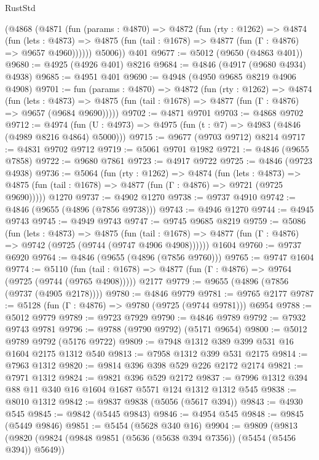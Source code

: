 \begin{lexlean}{RustStd}
\begin{coremodule}
      (@4868
        (@4871
          (fun (params : @4870) =>
          @4872
            (fun (rty : @1262) =>
            @4874
              (fun (lets : @4873) =>
              @4875 (fun (tail : @1678) => @4877 (fun (Γ : @4876) => @9657 @4960))))))
        @5006))
    @401
@9677 := @5012 (@9650 (@4863 @401))
@9680 := @4925 (@4926 @401) @8216
@9684 := @4846 (@4917 (@9680 @4934) @4938)
@9685 := @4951 @401
@9690 := @4948 (@4950 @9685 @8219 @4906 @4908)
@9701 := fun (params : @4870) =>
  @4872
    (fun (rty : @1262) =>
    @4874
      (fun (lets : @4873) =>
      @4875 (fun (tail : @1678) => @4877 (fun (Γ : @4876) => @9657 (@9684 @9690)))))
@9702 := @4871 @9701
@9703 := @4868 @9702
@9712 := @4974 (fun (U : @4973) => @4975 (fun (t : @7) => @4983 (@4846 (@4989 @8216 @4864) @5000)))
@9715 := @9677 (@9703 @9712) @8214
@9717 := @4831 @9702 @9712
@9719 := @5061 @9701 @1982
@9721 := @4846 (@9655 @7858)
@9722 := @9680 @7861
@9723 := @4917 @9722
@9725 := @4846 (@9723 @4938)
@9736 := @5064
    (fun (rty : @1262) =>
    @4874
      (fun (lets : @4873) =>
      @4875 (fun (tail : @1678) => @4877 (fun (Γ : @4876) => @9721 (@9725 @9690)))))
    @1270
@9737 := @4902 @1270
@9738 := @9737 @4910
@9742 := @4846 (@9655 (@4896 (@7856 @9738)))
@9743 := @4946 @1270
@9744 := @4945 @9743
@9745 := @4949 @9743
@9747 := @9745 @9685 @8219
@9759 := @5086
    (fun (lets : @4873) =>
    @4875
      (fun (tail : @1678) => @4877 (fun (Γ : @4876) => @9742 (@9725 (@9744 (@9747 @4906 @4908))))))
    @1604
@9760 := @9737 @6920
@9764 := @4846 (@9655 (@4896 (@7856 @9760)))
@9765 := @9747 @1604
@9774 := @5110
    (fun (tail : @1678) => @4877 (fun (Γ : @4876) => @9764 (@9725 (@9744 (@9765 @4908)))))
    @2177
@9779 := @9655 (@4896 (@7856 (@9737 (@4905 @2178))))
@9780 := @4846 @9779
@9781 := @9765 @2177
@9787 := @5128 (fun (Γ : @4876) => @9780 (@9725 (@9744 @9781))) @6954
@9788 := @5012 @9779
@9789 := @9723 @7929
@9790 := @4846 @9789
@9792 := @7932 @9743 @9781
@9796 := @9788 (@9790 @9792) (@5171 @9654)
@9800 := @5012 @9789 @9792 (@5176 @9722)
@9809 := @7948 @1312 @389 @399 @531 @16 @1604 @2175 @1312 @540
@9813 := @7958 @1312 @399 @531 @2175
@9814 := @7963 @1312
@9820 := @9814 @396 @398 @529 @226 @2172 @2174
@9821 := @7971 @1312
@9824 := @9821 @396 @529 @2172
@9837 := @7996 @1312 @394 @88 @11 @340 @16 @1604 @1687 @5571 @124 @1312 @1312 @545
@9838 := @8010 @1312
@9842 := @9837 @9838 (@5056 (@5617 @394))
@9843 := @4930 @545
@9845 := @9842 (@5445 @9843)
@9846 := @4954 @545
@9848 := @9845 (@5449 @9846)
@9851 := @5454 (@5628 @340 @16)
@9904 := @9809
    (@9813
      (@9820
        (@9824 (@9848 @9851 (@5636 (@5638 @394 @7356)) (@5454 (@5456 @394)) @5649))

\end{coremodule}
\end{lexlean}
